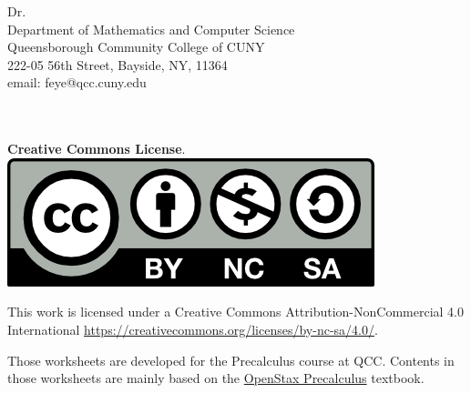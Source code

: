 


\frontmatter

\let\cleardoublepage\clearpage
\thispagestyle{empty}

  \vspace*{2\baselineskip}

  \begin{flushleft}
	Dr. \@author\\
	Department of Mathematics and Computer Science\\
	Queensborough Community College of CUNY\\
	222-05 56th Street, Bayside, NY, 11364\\
	email: feye@qcc.cuny.edu
\end{flushleft}

\vfill

\begin{flushleft}
	\textit{\@title}\\
	\@author \quad \textcopyright \the\year
	\\[1em]

	\textbf{Creative Commons License}.\\[0.25em]

	\includegraphics{by-nc-sa.png}

	This work is licensed under a Creative Commons Attribution-NonCommercial 4.0 International \href{CC BY-NC-SA}{https://creativecommons.org/licenses/by-nc-sa/4.0/}.
\end{flushleft}

\vspace*{2\baselineskip}


\newpage

\let\cleardoublepage\clearpage
\thispagestyle{empty}

\vspace*{2\baselineskip}



\bigskip

\renewcommand{\baselinestretch}{1.5}\normalsize

  Those worksheets are developed for the Precalculus course at QCC. Contents in those worksheets are mainly based on the \href{https://openstax.org/details/books/precalculus-2e}{OpenStax Precalculus} textbook.

  \newpage

  \let\cleardoublepage\clearpage
  
  \renewcommand{\baselinestretch}{0.975}\normalsize
  \tableofcontents*
  \thispagestyle{empty}
  \renewcommand{\baselinestretch}{1.0}\normalsize
  